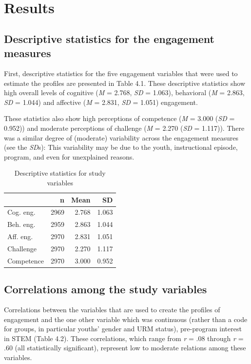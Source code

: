 \documentclass[]{msu-thesis}
\theoremstyle{definition}
\theoremstyle{definition}
\theoremstyle{definition}
\theoremstyle{remark}
\begin{document}
\chapter{Results}\label{results}

\section{Descriptive statistics for the engagement
measures}\label{descriptive-statistics-for-the-engagement-measures}

First, descriptive statistics for the five engagement variables that
were used to estimate the profiles are presented in Table 4.1. These
descriptive statistics show high overall levels of cognitive (\emph{M} =
2.768, \emph{SD} = 1.063), behavioral (\emph{M} = 2.863, \emph{SD} =
1.044) and affective (\emph{M} = 2.831, \emph{SD} = 1.051) engagement.

These statistics also show high perceptions of competence (\emph{M} =
3.000 (\emph{SD} = 0.952)) and moderate perceptions of challenge
(\emph{M} = 2.270 (\emph{SD} = 1.117)). There was a similar degree of
(moderate) variability across the engagement measures (see the
\emph{SD}s): This variability may be due to the youth, instructional
episode, program, and even for unexplained reasons.

\begin{table}

\caption{\label{tab:unnamed-chunk-7}Descriptive statistics for study variables}
\centering
\begin{tabular}[t]{lrrr}
\toprule
 & n & Mean & SD\\
\midrule
Cog. eng. & 2969 & 2.768 & 1.063\\
Beh. eng. & 2959 & 2.863 & 1.044\\
Aff. eng. & 2970 & 2.831 & 1.051\\
Challenge & 2970 & 2.270 & 1.117\\
Competence & 2970 & 3.000 & 0.952\\
\bottomrule
\end{tabular}
\end{table}

\section{Correlations among the study
variables}\label{correlations-among-the-study-variables}

Correlations between the variables that are used to create the profiles
of engagement and the one other variable which was continuous (rather
than a code for groups, in particular youths' gender and URM status),
pre-program interest in STEM (Table 4.2). These correlations, which
range from \emph{r} = .08 through \emph{r} = .60 (all statistically
significant), represent low to moderate relations among these variables.
\end{document}
